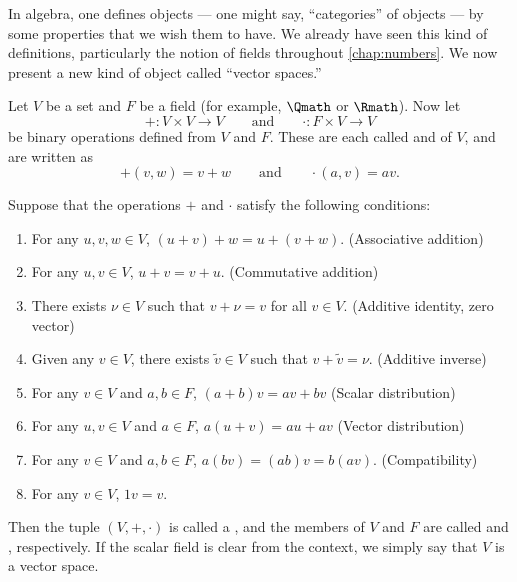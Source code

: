 \label{sec:vs}

In algebra, one defines objects
---
one might say, ``categories'' of objects
---
by some properties that we wish them to have.
We already have seen this kind of definitions,
particularly the notion of fields throughout \cref{chap:numbers}.
We now present a new kind of object called ``vector spaces.''

\begin{definition}
    \label{def:vs}
    Let \(V\) be a set
    and \(F\) be a field (for example, \(\Qmath\) or \(\Rmath\)).
    Now let
    \[
        +:V\times V\to V
        \qquad \text{and} \qquad
        \cdot:F\times V\to V
    \]
    be binary operations defined from \(V\) and \(F\).
    These are each called
     and  of \(V\),
    and are written as
    \[
        +(v,w)=v+w
        \qquad \text{and} \qquad
        \cdot(a,v)=av.
    \]
    
    Suppose that
    the operations \(+\) and \(\cdot\) satisfy the following conditions:
    \begin{enumerate}[label=(V-\arabic*)]
        \item For any \(u,v,w\in V\),
        \((u+v)+w=u+(v+w)\).
        \hfill(Associative addition)
        
        \item For any \(u,v\in V\),
        \(u+v=v+u\).
        \hfill(Commutative addition)

        \item There exists \(\nu\in V\) such that
        \(v+\nu=v\) for all \(v\in V\).
        \hfill(Additive identity, zero vector)

        \item Given any \(v\in V\),
        there exists \(\tilde v\in V\) such that
        \(v+\tilde v=\nu\).
        \hfill(Additive inverse)

        \item For any \(v\in V\) and \(a,b\in F\),
        \((a+b)v=av+bv\)
        \hfill(Scalar distribution)

        \item For any \(u,v\in V\) and \(a\in F\),
        \(a(u+v)=au+av\)
        \hfill(Vector distribution)

        \item For any \(v\in V\) and \(a,b\in F\),
        \(a(bv)=(ab)v=b(av)\).
        \hfill(Compatibility)

        \item For any \(v\in V\),
        \(1v=v\).
    \end{enumerate}
    Then the tuple \((V,+,\cdot)\) is called
    a ,
    and the members of \(V\) and \(F\) are called
     and , respectively.
    If the scalar field is clear from the context,
    we simply say that \(V\) is a vector space.
\end{definition}

